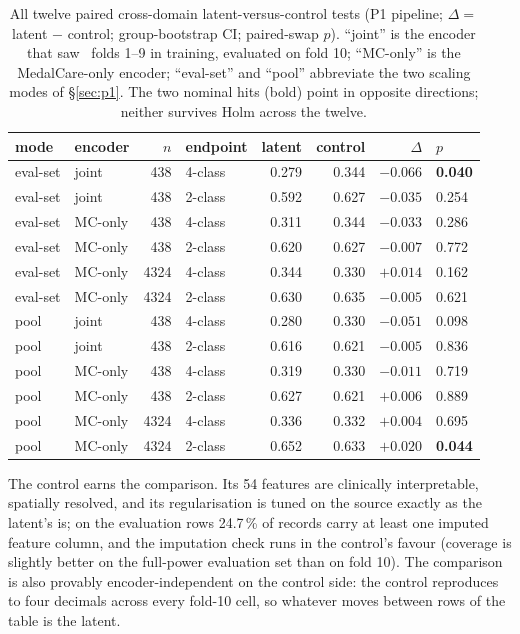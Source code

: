 \begin{table}[tb]
\centering\small
\caption{All twelve paired cross-domain latent-versus-control tests (P1 pipeline; $\Delta = $ latent $-$ control; group-bootstrap CI; paired-swap $p$). ``joint'' is the encoder that saw \ptbxl\ folds 1--9 in training, evaluated on fold 10; ``MC-only'' is the MedalCare-only encoder; ``eval-set'' and ``pool'' abbreviate the two scaling modes of \S\ref{sec:p1}. The two nominal hits (bold) point in opposite directions; neither survives Holm across the twelve.}
\label{tab:grid12}
\begin{tabular}{llrlrrrl}
\toprule
mode & encoder & $n$ & endpoint & latent & control & $\Delta$ & $p$ \\
\midrule
eval-set & joint & 438 & 4-class & 0.279 & 0.344 & $-0.066$ & \textbf{0.040} \\
eval-set & joint & 438 & 2-class & 0.592 & 0.627 & $-0.035$ & 0.254 \\
eval-set & MC-only & 438 & 4-class & 0.311 & 0.344 & $-0.033$ & 0.286 \\
eval-set & MC-only & 438 & 2-class & 0.620 & 0.627 & $-0.007$ & 0.772 \\
eval-set & MC-only & 4324 & 4-class & 0.344 & 0.330 & $+0.014$ & 0.162 \\
eval-set & MC-only & 4324 & 2-class & 0.630 & 0.635 & $-0.005$ & 0.621 \\
pool & joint & 438 & 4-class & 0.280 & 0.330 & $-0.051$ & 0.098 \\
pool & joint & 438 & 2-class & 0.616 & 0.621 & $-0.005$ & 0.836 \\
pool & MC-only & 438 & 4-class & 0.319 & 0.330 & $-0.011$ & 0.719 \\
pool & MC-only & 438 & 2-class & 0.627 & 0.621 & $+0.006$ & 0.889 \\
pool & MC-only & 4324 & 4-class & 0.336 & 0.332 & $+0.004$ & 0.695 \\
pool & MC-only & 4324 & 2-class & 0.652 & 0.633 & $+0.020$ & \textbf{0.044} \\
\bottomrule
\end{tabular}
\end{table}

The control earns the comparison. Its 54 features are clinically interpretable, spatially resolved, and its regularisation is tuned on the source exactly as the latent's is; on the evaluation rows 24.7\,\% of records carry at least one imputed feature column, and the imputation check runs in the control's favour (coverage is slightly better on the full-power evaluation set than on fold 10). The comparison is also provably encoder-independent on the control side: the control reproduces to four decimals across every fold-10 cell, so whatever moves between rows of the table is the latent. 

